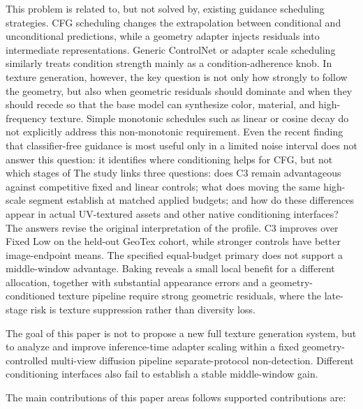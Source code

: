 \documentclass[times,twocolumn,final]{elsarticle}
\providecommand{\DIFadd}[1]{{\protect\color{blue} \sf #1}} %
\providecommand{\DIFdel}[1]{{\protect\color{red} \scriptsize #1}} %
\providecommand{\DIFaddbegin}{} %
\providecommand{\DIFaddend}{} %
\providecommand{\DIFdelbegin}{} %
\providecommand{\DIFdelend}{} %
\begin{document}
\DIFdelbegin \DIFdel{This problem is related to, but not solved by, existing guidance scheduling strategies. CFG scheduling changes the extrapolation between conditional and unconditional predictions, while a geometry adapter injects residuals into intermediate representations. Generic ControlNet or adapter scale scheduling similarly treats condition strength mainly as a condition-adherence knob. In texture generation, however, the key question is not only how strongly to follow the geometry, but also when geometric residuals should dominate and when they should recede so that the base model can synthesize color, material, and high-frequency texture. Simple monotonic schedules such as linear or cosine decay do not explicitly address this non-monotonic requirement.
Even the recent finding that classifier-free guidance is most useful only in a limited noise interval \cite{kynkanniemi2024limited} does not answer this question: it identifies where conditioning helps for CFG, but not which stages of }\DIFdelend \DIFaddbegin \DIFadd{The study links three questions: does C3 remain advantageous against competitive fixed and linear controls; what does moving the same high-scale segment establish at matched applied budgets; and how do these differences appear in actual UV-textured assets and other native conditioning interfaces? The answers revise the original interpretation of the profile. C3 improves over Fixed Low on the held-out GeoTex cohort, while stronger controls have better image-endpoint means. The specified equal-budget primary does not support a middle-window advantage. Baking reveals a small local benefit for a different allocation, together with substantial appearance errors and }\DIFaddend a \DIFdelbegin \DIFdel{geometry-conditioned texture pipeline require strong geometric residuals, where the late-stage risk is texture suppression rather than diversity loss. }%

\DIFdel{The goal of this paper is not to propose a new full texture generation system, but to analyze and improve inference-time adapter scaling within a fixed geometry-controlled multi-view diffusion pipeline}\DIFdelend \DIFaddbegin \DIFadd{separate-protocol non-detection. Different conditioning interfaces also fail to establish a stable middle-window gain}\DIFaddend .

The \DIFdelbegin \DIFdel{main contributions of this paper areas follows}\DIFdelend \DIFaddbegin \DIFadd{supported contributions are}\DIFaddend :
\end{document}
